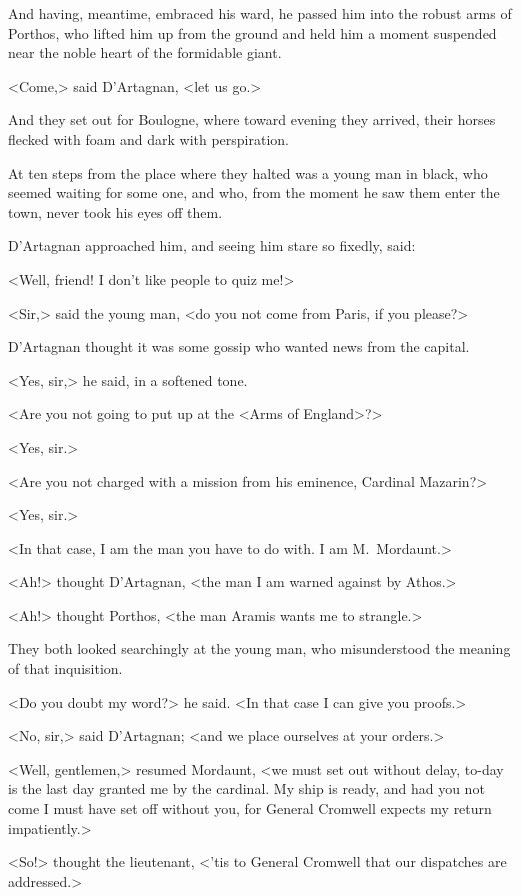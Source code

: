 And having, meantime, embraced his ward, he passed him into the robust arms of Porthos, who lifted him up from the ground and held him a moment suspended near the noble heart of the formidable giant.

<Come,> said D'Artagnan, <let us go.>

And they set out for Boulogne, where toward evening they arrived, their horses flecked with foam and dark with perspiration.

At ten steps from the place where they halted was a young man in black, who seemed waiting for some one, and who, from the moment he saw them enter the town, never took his eyes off them.

D'Artagnan approached him, and seeing him stare so fixedly, said:

<Well, friend! I don't like people to quiz me!>

<Sir,> said the young man, <do you not come from Paris, if you please?>

D'Artagnan thought it was some gossip who wanted news from the capital.

<Yes, sir,> he said, in a softened tone.

<Are you not going to put up at the <Arms of England>?>

<Yes, sir.>

<Are you not charged with a mission from his eminence, Cardinal Mazarin?>

<Yes, sir.>

<In that case, I am the man you have to do with. I am M.~Mordaunt.>

<Ah!> thought D'Artagnan, <the man I am warned against by Athos.>

<Ah!> thought Porthos, <the man Aramis wants me to strangle.>

They both looked searchingly at the young man, who misunderstood the meaning of that inquisition.

<Do you doubt my word?> he said. <In that case I can give you proofs.>

<No, sir,> said D'Artagnan; <and we place ourselves at your orders.>

<Well, gentlemen,> resumed Mordaunt, <we must set out without delay, to-day is the last day granted me by the cardinal. My ship is ready, and had you not come I must have set off without you, for General Cromwell expects my return impatiently.>

<So!> thought the lieutenant, <'tis to General Cromwell that our dispatches are addressed.>

